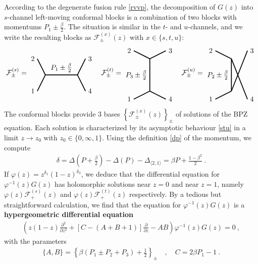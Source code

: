 \documentclass[12pt, a4paper]{article}
\theoremstyle{break}
\begin{document}
According to the degenerate fusion rule \eqref{rvvp}, the decomposition of $G(z)$ into $s$-channel left-moving conformal blocks is a combination of two blocks with momentums $P_1\pm \frac{\beta}{2}$. The situation is similar in the $t$- and $u$-channels, and we write the resulting blocks as $\mathcal{F}^{(x)}_\pm(z)$ with $x\in\{s,t,u\}$:
\begin{align}
\mathcal{F}^{(s)}_\pm = 
 \begin{tikzpicture}[baseline=(current  bounding  box.center), very thick, scale = .4]
\draw (-1,2) node [left] {$2$} -- (0,0) -- node [above] {$P_1\pm\frac{\beta}{2}$} (4,0) -- (5,2) node [right] {$3$};
\draw (-1,-2) node [left] {$1$} -- (0,0);
\draw (4,0) -- (5,-2) node [right] {$4$};
\end{tikzpicture}
\quad 
\mathcal{F}^{(t)}_\pm = 
\begin{tikzpicture}[baseline=(current  bounding  box.center), very thick, scale = .4]
 \draw (-2,3) node [left] {$2$} -- (0,2) -- node [left] {$P_3\pm\frac{\beta}{2}$} (0,-2) -- (-2, -3) node [left] {$1$};
\draw (0,2) -- (2,3) node [right] {$3$};
\draw (0,-2) -- (2, -3) node [right] {$4$};
\end{tikzpicture}
\quad 
\mathcal{F}^{(u)}_\pm = 
\begin{tikzpicture}[baseline=(current  bounding  box.center), very thick, scale = .4]
\draw (-2,1) node [left] {$2$} -- (0,0) -- node [left] {$P_2\pm \frac{\beta}{2}$} (0,-4) ;
\draw (0,0)-- (2,-5) node [right] {$4$};
\draw (-2,-5) node [left] {$1$} -- (0,-4);
\draw (0,-4) -- (2,1) node [right] {$3$};
\end{tikzpicture} 
\end{align}
The conformal blocks provide 3 bases $\left\{\mathcal{F}^{(x)}_\pm(z)\right\}_\pm$ of solutions of the BPZ equation. Each solution is characterized by its asymptotic behaviour \eqref{stu} in a limit $z\to z_0$ with $z_0\in\{0,\infty,1\}$. Using the definition \eqref{dp} of the momentum, we compute 
\begin{align}
 \delta=\Delta\left(P+\tfrac{\beta}{2}\right) - \Delta(P) -\Delta_{\langle 2,1\rangle} = \beta P + \tfrac{1-\beta^2}{2}\ .
\end{align}
If $\varphi(z) = z^{\delta_1}(1-z)^{\delta_3}$, we deduce that the differential equation for $\varphi^{-1}(z) G(z)$ has holomorphic solutions near $z=0$ and near $z=1$, namely $\varphi(z)\mathcal{F}^{(s)}_+(z)$ and $\varphi(z)\mathcal{F}^{(t)}_+(z)$ respectively. By a tedious but straightforward calculation, we find that the equation for $\varphi^{-1}(z) G(z)$ is a \textbf{hypergeometric differential equation} 
\begin{align}
 \left(z(1-z)\frac{\partial^2}{\partial z^2} + \left[C-(A+B+1)\right]\frac{\partial}{\partial z} -AB\right) \varphi^{-1}(z) G(z) = 0 \ , 
\end{align}
with the parameters 
\begin{align}
 \{A,B\} = \left\{\beta(P_1\pm P_2+P_3)+\tfrac12\right\}_\pm \quad , \quad  C=2\beta P_1-1\ .
\end{align}
\end{document}
